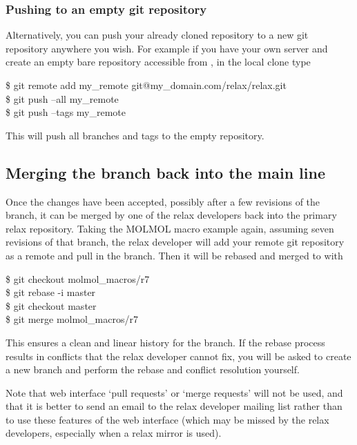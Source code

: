 \subsubsection{Pushing to an empty git repository}

Alternatively, you can push your already cloned repository to a new git repository anywhere you wish.
For example if you have your own server and create an empty bare repository accessible from , in the local clone type

\begin{exampleenv}
\$ git remote add my\_remote git@my\_domain.com/relax/relax.git \\
\$ git push --all my\_remote \\
\$ git push --tags my\_remote
\end{exampleenv}

This will push all branches and tags to the empty repository.


\subsection{Merging the branch back into the main line}

Once the changes have been accepted, possibly after a few revisions of the branch, it can be merged by one of the relax developers back into the primary relax repository.
Taking the MOLMOL macro example again, assuming seven revisions of that branch, the relax developer will add your remote git repository as a remote and pull in the branch.
Then it will be rebased and merged to  with

\begin{exampleenv}
\$ git checkout molmol\_macros/r7 \\
\$ git rebase -i master \\
\$ git checkout master \\
\$ git merge molmol\_macros/r7
\end{exampleenv}

This ensures a clean and linear history for the  branch.
If the rebase process results in conflicts that the relax developer cannot fix, you will be asked to create a new  branch and perform the rebase and conflict resolution yourself.

Note that web interface `pull requests' or `merge requests' will not be used, and that it is better to send an email to the relax developer mailing list rather than to use these features of the web interface (which may be missed by the relax developers, especially when a relax mirror is used).



